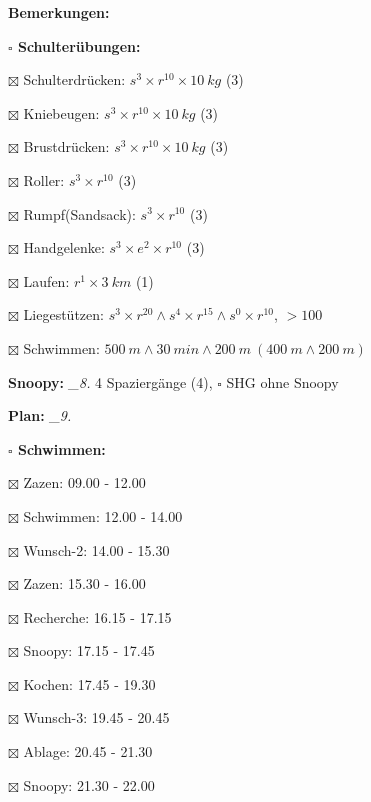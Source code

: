 \documentclass[10pt,a4paper]{article}
\newcommand\prop[1] {{\color {alizarin} {\bf #1}}}             %
\newcommand\mand[1] {{\color {burntorange} {\bf #1}}}          %
\newcommand\topspace{\vskip -15pt \hskip 20pt}
\newcommand\bottomspace{\vskip 4pt}
\newcommand\n[1] { {\sl #1.} \hskip 5pt }
\begin{document}
\begin{mdframed}[style=daystyle]
\begin{labeling}{{\mand {Bemerkungen:}}}
\begin{minipage}{0.75\textwidth}
\begin{labeling}{\prop {$\square$ {Schulterübungen:}}}
      \item[$\boxtimes$ Schulterdrücken:] $s^3 \times r^{10} \times 10\ kg$ (3)
      \item[$\boxtimes$ Kniebeugen:]      $s^3 \times r^{10} \times 10\ kg$ (3)
      \item[$\boxtimes$ Brustdrücken:]    $s^3 \times r^{10} \times 10\ kg$ (3)
      \item[$\boxtimes$ Roller:]          $s^3 \times r^{10}$ (3)
      \item[$\boxtimes$ Rumpf(Sandsack):] $s^3 \times r^{10}$ (3)
      \item[$\boxtimes$ Handgelenke:]     $s^3 \times e^2 \times r^{10}$ (3)
      \item[$\boxtimes$ Laufen:]          $r^1 \times 3\ km$ (1)
      \item[$\boxtimes$ Liegestützen:]    $s^3 \times r^{20} \land s^4 \times r^{15} \land s^0 \times r^{10}$, $> 100$
      \item[$\boxtimes$ Schwimmen:]       $500\ m \land 30\ min \land 200\ m\ (400\ m \land 200\ m)$
      \end{labeling}
    \end{minipage}
    \bottomspace        
  \item[{\mand {Snoopy:}}]        \n{\_8} 4 Spaziergänge (4), $\square$ SHG ohne Snoopy
  \item[{\mand {Plan:}}]          \n{\_9}
    \topspace
    \begin{minipage}{0.75\textwidth}  
      \begin{labeling}{\prop {$\square$ {Schwimmen:}}} 
        \setlength\itemsep{-3pt}
      \item[$\boxtimes$ Zazen:]      09.00 - 12.00
      \item[$\boxtimes$ Schwimmen:]  12.00 - 14.00
      \item[$\boxtimes$ Wunsch-2:]   14.00 - 15.30
      \item[$\boxtimes$ Zazen:]      15.30 - 16.00
      \item[$\boxtimes$ Recherche:]  16.15 - 17.15
      \item[$\boxtimes$ Snoopy:]     17.15 - 17.45
      \item[$\boxtimes$ Kochen:]     17.45 - 19.30
      \item[$\boxtimes$ Wunsch-3:]   19.45 - 20.45
      \item[$\boxtimes$ Ablage:]     20.45 - 21.30
      \item[$\boxtimes$ Snoopy:]     21.30 - 22.00
      \end{labeling}

\end{minipage}
\end{labeling}
\end{mdframed}
\end{document}
